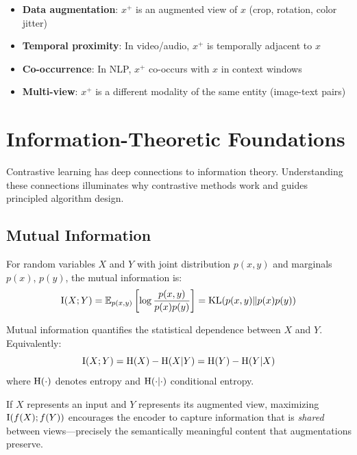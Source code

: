 \begin{notechapter}
\begin{example}
\leavevmode
\begin{itemize}
    \item \textbf{Data augmentation}: $x^+$ is an augmented view of $x$ (crop, rotation, color jitter)
    \item \textbf{Temporal proximity}: In video/audio, $x^+$ is temporally adjacent to $x$
    \item \textbf{Co-occurrence}: In NLP, $x^+$ co-occurs with $x$ in context windows
    \item \textbf{Multi-view}: $x^+$ is a different modality of the same entity (image-text pairs)
\end{itemize}
\end{example}

\section{Information-Theoretic Foundations}

Contrastive learning has deep connections to information theory. Understanding these connections illuminates why contrastive methods work and guides principled algorithm design.

\subsection{Mutual Information}

\begin{definition}
For random variables $X$ and $Y$ with joint distribution $p(x,y)$ and marginals $p(x)$, $p(y)$, the mutual information is:
\begin{equation}
\mathrm{I}(X; Y) = \mathbb{E}_{p(x,y)}\left[\log \frac{p(x,y)}{p(x)p(y)}\right] = \mathrm{KL}(p(x,y) \| p(x)p(y))
\end{equation}
\end{definition}

Mutual information quantifies the statistical dependence between $X$ and $Y$. Equivalently:
\begin{equation}
\mathrm{I}(X; Y) = \mathrm{H}(X) - \mathrm{H}(X|Y) = \mathrm{H}(Y) - \mathrm{H}(Y|X)
\end{equation}
where $\mathrm{H}(\cdot)$ denotes entropy and $\mathrm{H}(\cdot|\cdot)$ conditional entropy.

\begin{intuition}
If $X$ represents an input and $Y$ represents its augmented view, maximizing $\mathrm{I}(f(X); f(Y))$ encourages the encoder to capture information that is \emph{shared} between views---precisely the semantically meaningful content that augmentations preserve.
\end{intuition}


\end{notechapter}

